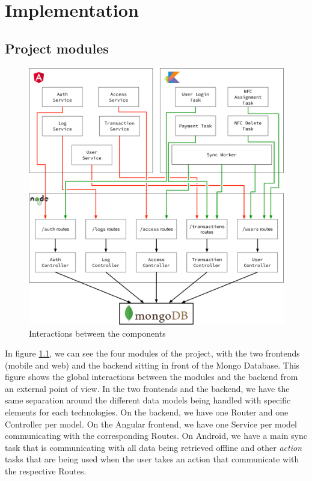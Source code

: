 \documentclass[twoside, openright,11pt,a4paper]{book}
\begin{document}
\chapter{Implementation}
\section{Project modules}
\begin{figure}[H]
\begin{center}
	\includegraphics[width=.9\textwidth]{assets/implementation}
	\caption{Interactions between the components}
	\label{all_modules_fig}
\end{center}
\end{figure}
In figure \ref{all_modules_fig}, we can see the four modules of the project, with the two frontends (mobile and web) and the backend sitting in front of the Mongo Database. This figure shows the global interactions between the modules and the backend from an external point of view. In the two frontends and the backend, we have the same separation around the different data models being handled with specific elements for each technologies. On the backend, we have one Router and one Controller per model. On the Angular frontend, we have one Service per model communicating with the corresponding Routes. On Android, we have a main sync task that is communicating with all data being retrieved offline and other \emph{action} tasks that are being used when the user takes an action that communicate with the respective Routes.\\
\end{document}
